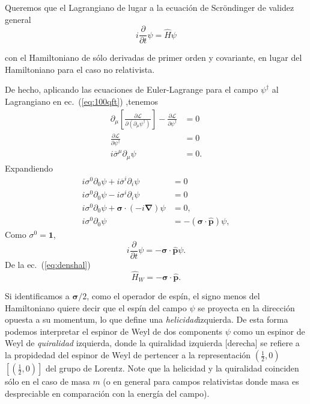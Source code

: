 \begin{frame}
Queremos que el Lagrangiano de lugar a la ecuación de Scröndinger de validez general
\begin{equation}
  \label{eq:grlsch}
  i\frac{\partial}{\partial t}\psi=\hat{H} \psi
\end{equation}
\end{frame}
con el Hamiltoniano de sólo derivadas de primer orden y covariante, en lugar del Hamiltoniano para el caso no relativista. 

\begin{frame}
De hecho, aplicando las ecuaciones de Euler-Lagrange para el campo $\psi^\dagger$ al Lagrangiano en ec.~(\ref{eq:100qft}) ,tenemos
\begin{align}
  \partial_\mu\left[\frac{\partial\mathcal{L}}{\partial\left(\partial_\mu\psi^\dagger\right)}\right]-\frac{\partial\mathcal{L}}{\partial\psi^\dagger}&=0\nonumber\\
  \frac{\partial\mathcal{L}}{\partial\psi^\dagger}&=0\nonumber\\
  \label{eq:114qftm}
  i \overline{\sigma}^\mu\partial_\mu\psi&=0.
\end{align}
Expandiendo
\begin{align*}
    i \sigma^0\partial_0\psi+i \overline{\sigma}^i\partial_i\psi&=0\\
  i \sigma^0\partial_0\psi-i \sigma^i\partial_i\psi&=0\\
  i \sigma^0\partial_0\psi+\boldsymbol\sigma\cdot(-i\boldsymbol{\nabla})\psi&=0,\\
  i \sigma^0\partial_0\psi&=-(\boldsymbol\sigma\cdot\hat{\boldsymbol{p}})\psi,
\end{align*}
Como $\sigma^0=\boldsymbol{1}$,
\begin{equation}
  \label{eq:wspinorL}
    i\frac{\partial}{\partial t}\psi=-\boldsymbol\sigma\cdot\hat{\boldsymbol{p}}\psi.
\end{equation}
De la ec.~(\ref{eq:denshal})
\begin{equation}
  \label{eq:186qft}
  \hat{H}_{W}= -\boldsymbol\sigma\cdot\hat{\boldsymbol{p}}.
\end{equation}
\end{frame}
Si identificamos a $\boldsymbol{\sigma}/2$, como el operador de espín, el signo menos del Hamiltoniano quiere decir que el espín del campo $\psi$ se proyecta en la dirección opuesta a su momentum, lo que define una  \emph{helicidad}izquierda. 
De esta forma podemos interpretar el espinor de Weyl de dos components $\psi$ como un espinor de Weyl de \emph{quiralidad} izquierda, donde la quiralidad izquierda [derecha] se refiere a la propidedad del espinor de Weyl de pertencer a la representación $\left(\frac{1}{2},0\right)$ $\left[\left(\frac{1}{2},0\right)\right]$ del grupo de Lorentz. Note que la helicidad y la quiralidad coinciden sólo en el caso de masa $m$ (o en general para campos relativistas donde masa es despreciable en comparación con la energía del campo).   


